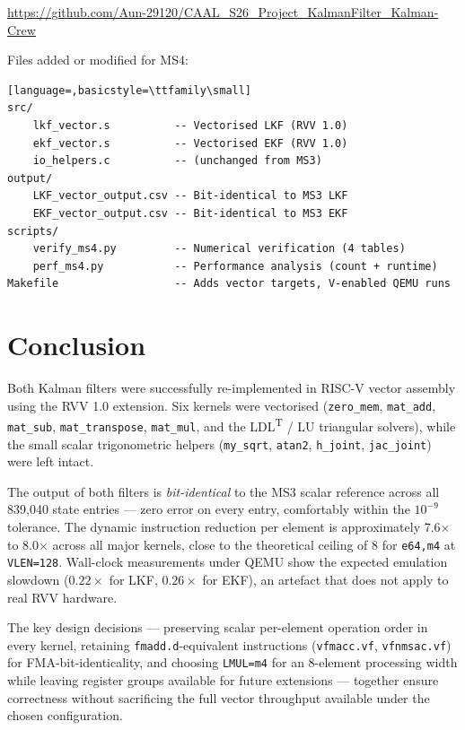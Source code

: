 \documentclass[11pt,a4paper]{article}
\begin{document}
\begin{center}
\small\url{https://github.com/Aun-29120/CAAL_S26_Project_KalmanFilter_Kalman-Crew}
\end{center}

\noindent
Files added or modified for MS4:

\begin{lstlisting}[language=,basicstyle=\ttfamily\small]
src/
    lkf_vector.s          -- Vectorised LKF (RVV 1.0)
    ekf_vector.s          -- Vectorised EKF (RVV 1.0)
    io_helpers.c          -- (unchanged from MS3)
output/
    LKF_vector_output.csv -- Bit-identical to MS3 LKF
    EKF_vector_output.csv -- Bit-identical to MS3 EKF
scripts/
    verify_ms4.py         -- Numerical verification (4 tables)
    perf_ms4.py           -- Performance analysis (count + runtime)
Makefile                  -- Adds vector targets, V-enabled QEMU runs
\end{lstlisting}

\section{Conclusion}

Both Kalman filters were successfully re-implemented in RISC-V vector
assembly using the RVV 1.0 extension. Six kernels were vectorised
(\texttt{zero\_mem}, \texttt{mat\_add}, \texttt{mat\_sub},
\texttt{mat\_transpose}, \texttt{mat\_mul}, and the LDL\textsuperscript{T}
/ LU triangular solvers), while the small scalar trigonometric helpers
(\texttt{my\_sqrt}, \texttt{atan2}, \texttt{h\_joint},
\texttt{jac\_joint}) were left intact.

The output of both filters is \emph{bit-identical} to the MS3 scalar
reference across all 839{,}040 state entries --- zero error on every
entry, comfortably within the $10^{-9}$ tolerance. The dynamic instruction
reduction per element is approximately 7.6$\times$ to 8.0$\times$ across
all major kernels, close to the theoretical ceiling of 8 for
\texttt{e64,m4} at \texttt{VLEN=128}. Wall-clock measurements under QEMU
show the expected emulation slowdown ($0.22\times$ for LKF, $0.26\times$
for EKF), an artefact that does not apply to real RVV hardware.

The key design decisions --- preserving scalar per-element operation order
in every kernel, retaining \texttt{fmadd.d}-equivalent instructions
(\texttt{vfmacc.vf}, \texttt{vfnmsac.vf}) for FMA-bit-identicality, and
choosing \texttt{LMUL=m4} for an 8-element processing width while leaving
register groups available for future extensions --- together ensure
correctness without sacrificing the full vector throughput available
under the chosen configuration.
\end{document}
